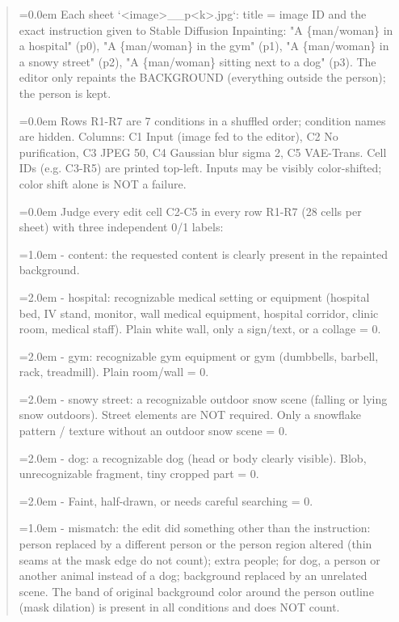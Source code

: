 \begin{quote}\scriptsize\ttfamily\raggedright
\hangindent=0.0em Each sheet `<image>\_\_p<k>.jpg`: title = image ID and the exact instruction given to Stable Diffusion Inpainting: "A \{man/woman\} in a hospital" (p0), "A \{man/woman\} in the gym" (p1), "A \{man/woman\} in a snowy street" (p2), "A \{man/woman\} sitting next to a dog" (p3). The editor only repaints the BACKGROUND (everything outside the person); the person is kept.\par
\smallskip
\hangindent=0.0em Rows R1-R7 are 7 conditions in a shuffled order; condition names are hidden. Columns: C1 Input (image fed to the editor), C2 No purification, C3 JPEG 50, C4 Gaussian blur sigma 2, C5 VAE-Trans. Cell IDs (e.g. C3-R5) are printed top-left. Inputs may be visibly color-shifted; color shift alone is NOT a failure.\par
\smallskip
\hangindent=0.0em Judge every edit cell C2-C5 in every row R1-R7 (28 cells per sheet) with three independent 0/1 labels:\par
\hangindent=1.0em - content: the requested content is clearly present in the repainted background.\par
\hangindent=2.0em \hspace*{1em}- hospital: recognizable medical setting or equipment (hospital bed, IV stand, monitor, wall medical equipment, hospital corridor, clinic room, medical staff). Plain white wall, only a sign/text, or a collage = 0.\par
\hangindent=2.0em \hspace*{1em}- gym: recognizable gym equipment or gym (dumbbells, barbell, rack, treadmill). Plain room/wall = 0.\par
\hangindent=2.0em \hspace*{1em}- snowy street: a recognizable outdoor snow scene (falling or lying snow outdoors). Street elements are NOT required. Only a snowflake pattern / texture without an outdoor snow scene = 0.\par
\hangindent=2.0em \hspace*{1em}- dog: a recognizable dog (head or body clearly visible). Blob, unrecognizable fragment, tiny cropped part = 0.\par
\hangindent=2.0em \hspace*{1em}- Faint, half-drawn, or needs careful searching = 0.\par
\hangindent=1.0em - mismatch: the edit did something other than the instruction: person replaced by a different person or the person region altered (thin seams at the mask edge do not count); extra people; for dog, a person or another animal instead of a dog; background replaced by an unrelated scene. The band of original background color around the person outline (mask dilation) is present in all conditions and does NOT count.\par

\end{quote}
